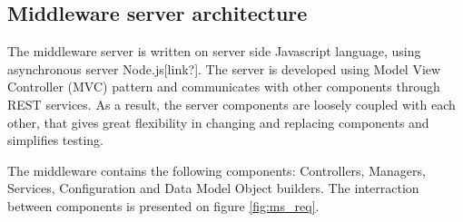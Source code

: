 \subsection{Middleware server architecture}

The middleware server is written on server side Javascript language, using asynchronous server Node.js[link?]. The server is developed using Model View Controller (MVC) pattern and communicates with other components through REST services. As a result, the server components are loosely coupled with each other, that gives great flexibility in changing and replacing components and simplifies testing. 

The middleware contains the following components: Controllers, Managers, Services, Configuration and Data Model Object builders. The interraction between components is presented on figure \ref{fig:ms_req}.

